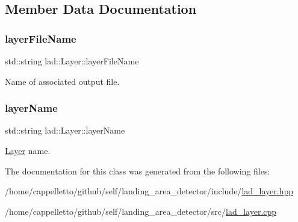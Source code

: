 \subsection{Member Data Documentation}
\mbox{\label{classlad_1_1_layer_a45420738ed98b38b86b863d1330c54f3}} 
\subsubsection{\texorpdfstring{layer\+File\+Name}{layerFileName}}
{\footnotesize\ttfamily std\+::string lad\+::\+Layer\+::layer\+File\+Name}



Name of associated output file. 

\mbox{\label{classlad_1_1_layer_aadee8f64504428828f92591090f4f27d}} 
\subsubsection{\texorpdfstring{layer\+Name}{layerName}}
{\footnotesize\ttfamily std\+::string lad\+::\+Layer\+::layer\+Name}



\hyperlink{classlad_1_1_layer}{Layer} name. 



The documentation for this class was generated from the following files\+:\begin{DoxyCompactItemize}
\item 
/home/cappelletto/github/self/landing\+\_\+area\+\_\+detector/include/\hyperlink{lad__layer_8hpp}{lad\+\_\+layer.\+hpp}\item 
/home/cappelletto/github/self/landing\+\_\+area\+\_\+detector/src/\hyperlink{lad__layer_8cpp}{lad\+\_\+layer.\+cpp}\end{DoxyCompactItemize}

